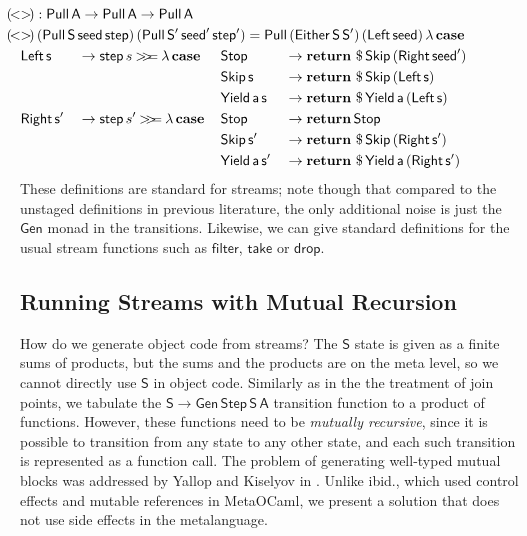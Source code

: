 \documentclass[acmsmall,screen,review,anonymous]{acmart}
\newcommand{\mit}[1]{{\mathsf{#1}}}
\newcommand{\msf}[1]{{\mathsf{#1}}}
\newcommand{\mbf}[1]{{\mathbf{#1}}}
\newcommand{\ind}{\hspace{1em}}
\newcommand{\return}{\mbf{return}\,}
\newcommand{\lam}{\lambda\,}
\newcommand{\vA}{\mathsf{A}}
\newcommand{\vS}{\mathsf{S}}
\newcommand{\va}{\mathsf{a}}
\newcommand{\vs}{\mathsf{s}}
\newcommand{\case}{\mbf{case\,}}
\newcommand{\bind}{\mathbin{>\!\!>\mkern-6.7mu=}}
\theoremstyle{remark}
\newcommand{\Gen}{\msf{Gen}}
\newcommand{\Either}{\msf{Either}}
\newcommand{\Left}{\msf{Left}}
\newcommand{\Right}{\msf{Right}}
\newcommand{\Stop}{\msf{Stop}}
\newcommand{\Skip}{\msf{Skip}}
\newcommand{\Yield}{\msf{Yield}}
\newcommand{\dlr}{\,\$\,}
\newcommand{\seed}{\mit{seed}}
\newcommand{\step}{\mit{step}}
\newcommand{\Step}{\msf{Step}}
\newcommand{\Pull}{\msf{Pull}}
\begin{document}
\begin{alignat*}{5}
  & \hspace{-4em}\mathrlap{(\!<>\!) : \Pull\,\vA \to \Pull\,\vA \to \Pull\,\vA} \\
  & \hspace{-4em}\mathrlap{(\!<>\!)\,(\Pull\,\vS\,\seed\,\step)\,(\Pull\,\vS'\,\seed'\,\step') = \Pull\,(\Either\,\vS\,\vS')\,(\Left\,\seed)\,\lam \case} \\
  & \hspace{-4em}\ind \Left\,\vs &&\to \step\,s \bind \lam \case &&\Stop             &&\to \return \dlr \Skip\,(\Right\,\seed')\\
  & \hspace{-4em}                    &&                          &&\Skip\,\vs        &&\to \return \dlr \Skip\,(\Left\,\vs) \\
  & \hspace{-4em}                    &&                        &&\Yield\,\va\,\vs    &&\to \return \dlr \Yield\,\va\,(\Left\,\vs)\\
  & \hspace{-4em}\ind \Right\,\vs' &&\to \step\,s' \bind \lam \case &&\Stop          &&\to \return \Stop\\
  & \hspace{-4em}                    &&                        &&\Skip\,\vs'         &&\to \return \dlr \Skip\,(\Right\,\vs') \\
  & \hspace{-4em}                    &&                        &&\Yield\,\va\,\vs'   &&\to \return \dlr \Yield\,\va\,(\Right\,\vs')
\end{alignat*}
These definitions are standard for streams; note though that compared to the
unstaged definitions in previous literature, the only additional noise is just
the $\Gen$ monad in the transitions. Likewise, we can give standard definitions
for the usual stream functions such as $\msf{filter}$, $\msf{take}$ or
$\msf{drop}$.

\subsection{Running Streams with Mutual Recursion}

How do we generate object code from streams? The $\vS$ state is given as a
finite sums of products, but the sums and the products are on the meta
level, so we cannot directly use $\vS$ in object code. Similarly as in the the
treatment of join points, we tabulate the $\vS \to \Gen\,\Step\,\vS\,\vA$
transition function to a product of functions. However, these functions need to
be \emph{mutually recursive}, since it is possible to transition from any state
to any other state, and each such transition is represented as a function call.
The problem of generating well-typed mutual blocks was addressed by Yallop and
Kiselyov in \cite{TODO}. Unlike ibid., which used control effects and mutable
references in MetaOCaml, we present a solution that does not use side effects
in the metalanguage.
\end{document}
